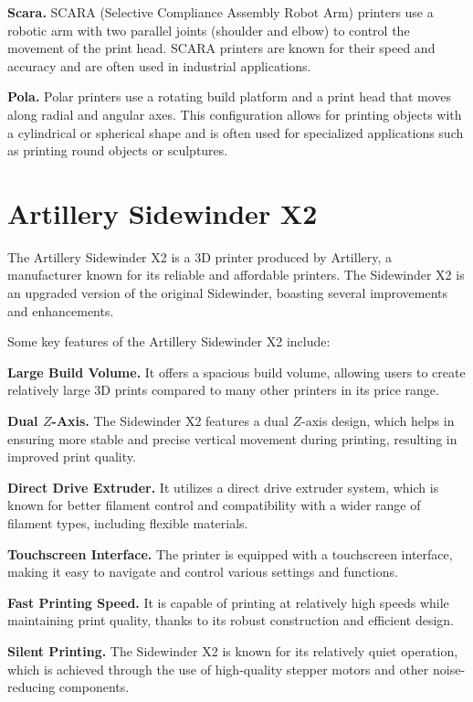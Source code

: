 \noindent\textbf{Scara.}
SCARA (Selective Compliance Assembly Robot Arm) printers use a robotic arm
with two parallel joints (shoulder and elbow) to control the movement of the print head.
SCARA printers are known for their speed and accuracy and are often used in industrial applications.


\noindent\textbf{Pola.}
Polar printers use a rotating build platform and a print head that moves along radial and angular axes. This configuration allows for printing objects with a cylindrical or spherical shape and is often used for specialized applications such as printing round objects or sculptures.


\section{Artillery Sidewinder X2}

The Artillery Sidewinder X2 is a 3D printer produced by Artillery, a manufacturer known for its reliable and affordable printers. The Sidewinder X2 is an upgraded version of the original Sidewinder, boasting several improvements and enhancements.

Some key features of the Artillery Sidewinder X2 include:

\noindent\textbf{Large Build Volume.}
It offers a spacious build volume, allowing users to create relatively large 3D prints compared to many other printers in its price range.

\noindent\textbf{Dual $Z$-Axis.}
The Sidewinder X2 features a dual $Z$-axis design, which helps in ensuring more stable and precise vertical movement during printing, resulting in improved print quality.

\noindent\textbf{Direct Drive Extruder.}
It utilizes a direct drive extruder system, which is known for better filament control and compatibility with a wider range of filament types,
including flexible materials.

\noindent\textbf{Touchscreen Interface.}
The printer is equipped with a touchscreen interface, making it easy to navigate and control various settings and functions.

\noindent\textbf{Fast Printing Speed.}
It is capable of printing at relatively high speeds while maintaining print quality,
thanks to its robust construction and efficient design.

\noindent\textbf{Silent Printing.}
The Sidewinder X2 is known for its relatively quiet operation,
which is achieved through the use of high-quality stepper motors and other noise-reducing components.

